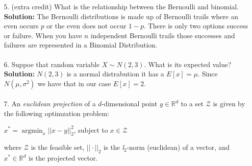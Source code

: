 \documentclass[a4paper]{article}
\DeclareMathOperator*{\argmin}{\arg\min}
\begin{document}
5. (extra credit) What is the relationship between the Bernoulli
and binomial.
\\
\indent \textbf{Solution:} The Bernoulli distributions is made up of Bernoulli
trails where an even occurs $p$ or the even does not occur $1-p$.
There is only two options success or failure. When you have $n$
independent Bernoulli trails those successes and failures are
represented in a Binomial Distribution.
\\
\\
6. Suppoe that random variable $X \sim N(2,3)$. What is its expected
value?
\\
\indent \textbf{Solution:} $ N(2,3)$ is a normal distrabution it has a
$E[x]=\mu$. Since $N(\mu,\sigma^2)$ we have that in our case $E[x]=2$.
\\
\\
7. An \textit{euclidean projection} of a $d$-dimensional point
$y\in \mathbb{R}^d$ to a set $\mathcal{Z}$ is given by the following
optimzation problem:
\begin{center}
$x^*=\argmin_x ||x-y||^2_2$, subject to $x\in \mathcal{Z}$
\end{center}
where $\mathcal{Z}$ is the feasible set, $||\cdot||_2$ is the
\textit{l}$_2$-norm (euclidean) of a vector, and $x^*\in\mathbb{R}^d$
is the projected vector.
\end{document}

